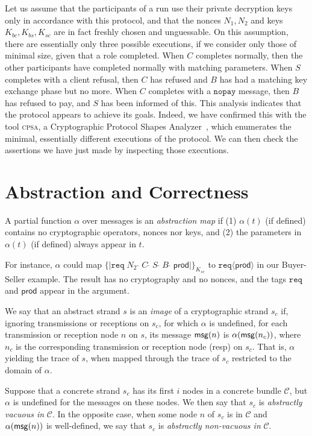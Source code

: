 \documentclass[copyright]{eptcs}
\newcommand{\kind}[1]{\ensuremath{\mathsf{#1}}}
\newcommand{\bndC}{\mathcal{C}}
\newcommand{\cons}{\,{\hat{\ }}\,}
\newcommand{\enc}[2]{\{\!\!|#1|\!\!\}_{#2}}
\newcommand{\term}{\kind{msg\/}}
\begin{document}
Let us assume that the participants of a run use their private
decryption keys only in accordance with this protocol, and that the
nonces $N_1,N_2$ and keys $K_{bc},K_{bs},K_{sc}$ are in fact freshly
chosen and unguessable.  On this assumption, there are essentially
only three possible executions, if we consider only those of minimal
size, given that a role completed.  When $C$ completes normally, then
the other participants have completed normally with matching
parameters.  When $S$ completes with a client refusal, then $C$ has
refused and $B$ has had a matching key exchange phase but no more.
When $C$ completes with a $\texttt{nopay}$ message, then $B$ has
refused to pay, and $S$ has been informed of this.  This analysis
indicates that the protocol appears to achieve its goals.  Indeed, we
have confirmed this with the tool \textsc{cpsa}, a Cryptographic
Protocol Shapes Analyzer~\cite{DoghmiGuttmanThayer07}, which
enumerates the minimal, essentially different executions of the
protocol.  We can then check the assertions we have just made by
inspecting those executions.  
 



\section{Abstraction and Correctness} A partial function $\alpha$ over
messages is an \emph{abstraction map} if (1) $\alpha(t)$ (if defined)
contains no cryptographic operators, nonces nor keys, and (2) the
parameters in $\alpha(t)$ (if defined) always appear in $t$.

For instance, $\alpha$ could map $\enc{\texttt{req}\; N_2 \cons C\cons
  S\cons B\cons \mathsf{prod}}{K_{sc}}$ to
${\texttt{req}\langle\mathsf{prod}\rangle}$ in our Buyer-Seller
example.  The result has no cryptography and no nonces, and the tags
$\texttt{req}$ and $\mathsf{prod}$ appear in the argument.  

We say that an abstract strand $s$ is an \emph{image} of a
cryptographic strand $s_c$ if, ignoring transmissions or receptions on
$s_c$, for which $\alpha$ is undefined, for each transmission or
reception node $n$ on $s$, its message $\term(n)$ is
$\alpha(\term(n_c))$, where $n_c$ is the corresponding transmission or
reception node (resp) on $s_c$.  That is, $\alpha$ yielding the trace
of $s$, when mapped through the trace of $s_c$ restricted to the
domain of $\alpha$.

Suppose that a concrete strand $s_c$ has its first $i$ nodes in a
concrete bundle $\bndC$, but $\alpha$ is undefined for the messages on
these nodes.  We then say that $s_c$ is \emph{abstractly vacuous in}
$\bndC$.  In the opposite case, when some node $n$ of $s_c$ is in
$\bndC$ and $\alpha(\term(n))$ is well-defined, we say that $s_c$ is
\emph{abstractly non-vacuous in} $\bndC$.
\end{document}
